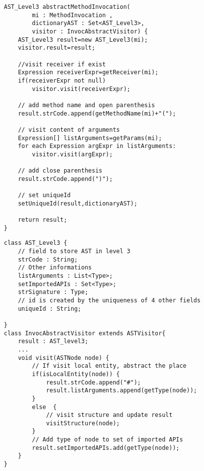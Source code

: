 \begin{minipage}[c]{0.45\textwidth}
\begin{lstlisting}[basicstyle=\tiny,caption={Algorithm for Method Invocation Abstraction},label={lt:AlgorithmMethodAbstractor}]
AST_Level3 abstractMethodInvocation(
		mi : MethodInvocation ,
		dictionaryAST : Set<AST_Level3>,
		visitor : InvocAbstractVisitor) {
	AST_Level3 result=new AST_Level3(mi);		
	visitor.result=result;
	
	//visit receiver if exist
	Expression receiverExpr=getReceiver(mi);		
	if(receiverExpr not null)
		visitor.visit(receiverExpr);
	
	// add method name and open parenthesis
	result.strCode.append(getMethodName(mi)+"(");
	
	// visit content of arguments
	Expression[] listArguments=getParams(mi);		
	for each Expression argExpr in listArguments:
		visitor.visit(argExpr);
	
	// add close parenthesis
	result.strCode.append(")");

	// set uniqueId
	setUniqueId(result,dictionaryAST);
	
	return result;		
}

\end{lstlisting}
\end{minipage}\hfill
\begin{minipage}[c]{0.45\textwidth}
\begin{lstlisting}[basicstyle=\tiny,caption={Definition of AST\_Level3 and InvocAbstractVisitor},label={lt:AlgorithmMethodAbstractorPartB}]
class AST_Level3 {
	// field to store AST in level 3
	strCode : String;
	// Other informations
	listArguments : List<Type>;
	setImportedAPIs : Set<Type>;	
	strSignature : Type;
	// id is created by the uniqueness of 4 other fields 
	uniqueId : String;
	
}
class InvocAbstractVisitor extends ASTVisitor{
	result : AST_level3;
	...		
	void visit(ASTNode node) {
		// If visit local entity, abstract the place
		if(isLocalEntity(node)) {
			result.strCode.append("#");
			result.listArguments.append(getType(node));				
		} 
		else  {	
			// visit structure and update result
			visitStructure(node);
		} 			
		// Add type of node to set of imported APIs
		result.setImportedAPIs.add(getType(node));		
	}	
}
\end{lstlisting}

\end{minipage}\hfill



